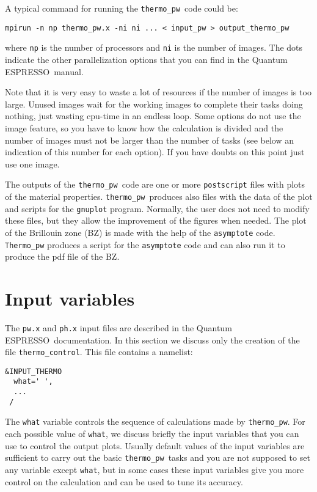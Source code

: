 \documentclass[12pt,a4paper]{article}
\def\qe{{\sc Quantum ESPRESSO}}
\def\thermo{\texttt{thermo\_pw}}
\begin{document}
A typical command for running the \thermo\ code could be:
\begin{verbatim}
mpirun -n np thermo_pw.x -ni ni ... < input_pw > output_thermo_pw
\end{verbatim}
where \texttt{np} is the number of processors and \texttt{ni} is the number 
of images. The dots indicate the other parallelization options that
you can find in the \qe\ manual.

Note that it is very easy to waste a lot of resources if the number of 
images is too large. Unused images wait for the working images to complete
their tasks doing nothing, just wasting cpu-time in an endless loop. 
Some options 
do not use the image feature, so you have to know how the calculation 
is divided and the number of images must not
be larger than the number of tasks (see below an indication of this number
for each option). If you have doubts on this point just use one image.

The outputs of the \thermo\ code are one or more \texttt{postscript} files 
with plots of the material properties. \thermo\ produces also files with 
the data of 
the plot and scripts for the \texttt{gnuplot} program. 
Normally, the user does not need to modify these files, but they allow 
the improvement of the figures when needed.
The plot of the Brillouin zone (BZ) is made with the help of the 
\texttt{asymptote} code. \texttt{Thermo\_pw} produces a script 
for the \texttt{asymptote} code and can also run it to produce the pdf
file of the BZ. 

\section{Input variables}

The \texttt{pw.x} and \texttt{ph.x} input files are described in the \qe\ documentation.
In this section we discuss only the creation of the file
\texttt{thermo\_control}. This file contains a namelist:  
\begin{verbatim}
&INPUT_THERMO
  what=' ',
  ...
 /
\end{verbatim}
The \texttt{what} variable controls the sequence of calculations made
by \thermo. For each possible value of \texttt{what}, we discuss briefly the
input variables that you can use to control the output plots. Usually
default values of the input variables are sufficient to carry out  
the basic \thermo\ tasks and you are not supposed to set any variable except
\texttt{what}, but in some cases these input variables give you more control
on the calculation and can be used to tune its accuracy.
\end{document}
